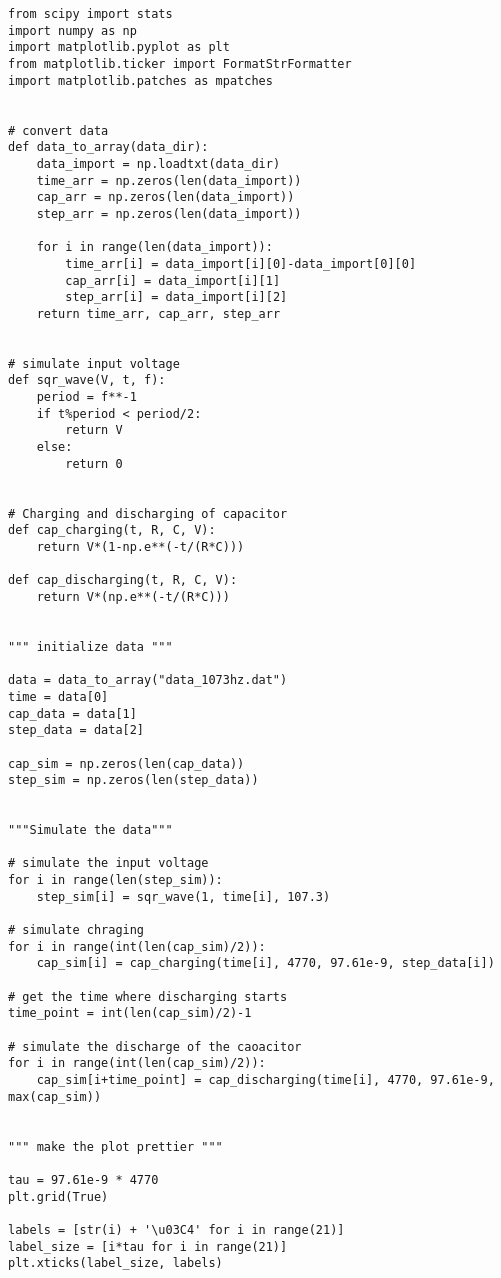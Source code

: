 \lstset{language=Python}
\lstset{frame=lines}
\lstset{numbers = left}
\begin{lstlisting}[breaklines]
from scipy import stats
import numpy as np
import matplotlib.pyplot as plt
from matplotlib.ticker import FormatStrFormatter
import matplotlib.patches as mpatches


# convert data
def data_to_array(data_dir): 
    data_import = np.loadtxt(data_dir)
    time_arr = np.zeros(len(data_import))
    cap_arr = np.zeros(len(data_import))
    step_arr = np.zeros(len(data_import))

    for i in range(len(data_import)):
        time_arr[i] = data_import[i][0]-data_import[0][0]
        cap_arr[i] = data_import[i][1]
        step_arr[i] = data_import[i][2]
    return time_arr, cap_arr, step_arr


# simulate input voltage
def sqr_wave(V, t, f): 
    period = f**-1
    if t%period < period/2:
        return V
    else:
        return 0


# Charging and discharging of capacitor
def cap_charging(t, R, C, V): 
    return V*(1-np.e**(-t/(R*C)))

def cap_discharging(t, R, C, V):
    return V*(np.e**(-t/(R*C))) 


""" initialize data """
    
data = data_to_array("data_1073hz.dat")
time = data[0]
cap_data = data[1]
step_data = data[2]

cap_sim = np.zeros(len(cap_data))
step_sim = np.zeros(len(step_data))


"""Simulate the data"""

# simulate the input voltage
for i in range(len(step_sim)):
    step_sim[i] = sqr_wave(1, time[i], 107.3)

# simulate chraging
for i in range(int(len(cap_sim)/2)):
    cap_sim[i] = cap_charging(time[i], 4770, 97.61e-9, step_data[i])

# get the time where discharging starts
time_point = int(len(cap_sim)/2)-1

# simulate the discharge of the caoacitor
for i in range(int(len(cap_sim)/2)):
    cap_sim[i+time_point] = cap_discharging(time[i], 4770, 97.61e-9, max(cap_sim))
    

""" make the plot prettier """

tau = 97.61e-9 * 4770
plt.grid(True)                     

labels = [str(i) + '\u03C4' for i in range(21)]                     
label_size = [i*tau for i in range(21)]                             
plt.xticks(label_size, labels)                                      


\end{lstlisting}
